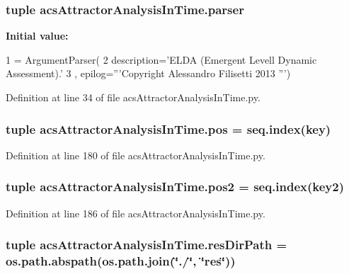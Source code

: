 \hypertarget{a00092_abed547533f84e18ca5b4c4a2cfaef63a}{
\subsubsection[{parser}]{\setlength{\rightskip}{0pt plus 5cm}tuple acs\-Attractor\-Analysis\-In\-Time.\-parser}}\label{a00092_abed547533f84e18ca5b4c4a2cfaef63a}
{\bfseries Initial value\-:}
\begin{DoxyCode}
1 = ArgumentParser(
2                                 description=\textcolor{stringliteral}{'ELDA (Emergent Levell Dynamic       Assessment).'}
3                                 , epilog=\textcolor{stringliteral}{'''Copyright Alessandro Filisetti 2013 '''})
\end{DoxyCode}


Definition at line 34 of file acs\-Attractor\-Analysis\-In\-Time.\-py.

\hypertarget{a00092_aa39692272363cd6f687c4b2a53f96594}{
\subsubsection[{pos}]{\setlength{\rightskip}{0pt plus 5cm}tuple acs\-Attractor\-Analysis\-In\-Time.\-pos = {\bf seq.\-index}(key)}}\label{a00092_aa39692272363cd6f687c4b2a53f96594}


Definition at line 180 of file acs\-Attractor\-Analysis\-In\-Time.\-py.

\hypertarget{a00092_a49fec7e1deea4728b5ef4a487d155de9}{
\subsubsection[{pos2}]{\setlength{\rightskip}{0pt plus 5cm}tuple acs\-Attractor\-Analysis\-In\-Time.\-pos2 = {\bf seq.\-index}(key2)}}\label{a00092_a49fec7e1deea4728b5ef4a487d155de9}


Definition at line 186 of file acs\-Attractor\-Analysis\-In\-Time.\-py.

\hypertarget{a00092_a28ca19f0f566396ef664e068a41a2837}{
\subsubsection[{res\-Dir\-Path}]{\setlength{\rightskip}{0pt plus 5cm}tuple acs\-Attractor\-Analysis\-In\-Time.\-res\-Dir\-Path = os.\-path.\-abspath(os.\-path.\-join(\char`\"{}./\char`\"{}, \char`\"{}res\char`\"{}))}}\label{a00092_a28ca19f0f566396ef664e068a41a2837}


